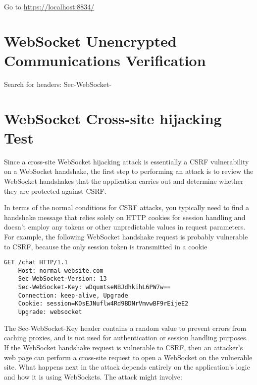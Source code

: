     

    

Go to \url{https://localhost:8834/}


\section{WebSocket Unencrypted Communications Verification}

Search for headers: Sec-WebSocket-

\section{WebSocket Cross-site hijacking Test}

Since a cross-site WebSocket hijacking attack is essentially a CSRF vulnerability on a WebSocket handshake, the first step to performing an attack is to review the WebSocket handshakes that the application carries out and determine whether they are protected against CSRF.

In terms of the normal conditions for CSRF attacks, you typically need to find a handshake message that relies solely on HTTP cookies for session handling and doesn't employ any tokens or other unpredictable values in request parameters.
For example, the following WebSocket handshake request is probably vulnerable to CSRF, because the only session token is transmitted in a cookie


\begin{lstlisting}[numbers=none]
	GET /chat HTTP/1.1
	Host: normal-website.com
	Sec-WebSocket-Version: 13
	Sec-WebSocket-Key: wDqumtseNBJdhkihL6PW7w==
	Connection: keep-alive, Upgrade
	Cookie: session=KOsEJNuflw4Rd9BDNrVmvwBF9rEijeE2
	Upgrade: websocket
\end{lstlisting}

\begin{fullwidth} %
The Sec-WebSocket-Key header contains a random value to prevent errors from caching proxies, and is not used for authentication or session handling purposes.
If the WebSocket handshake request is vulnerable to CSRF, then an attacker's web page can perform a cross-site request to open a WebSocket on the vulnerable site. What happens next in the attack depends entirely on the application's logic and how it is using WebSockets. The attack might involve:
\end{fullwidth}

